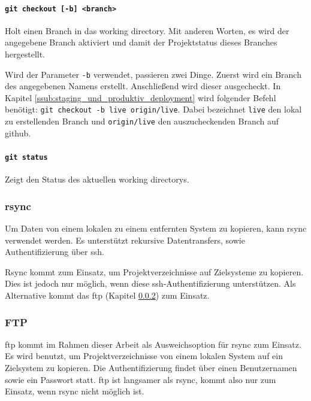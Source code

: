 \paragraph{\lstinline!git checkout [-b] <branch>!} %
\label{par:git_checkout}
Holt einen Branch in das \gls{working directory}. Mit anderen Worten, es wird der angegebene Branch aktiviert und damit der Projektstatus dieses Branches hergestellt.

Wird der Parameter \lstinline!-b! verwendet, passieren zwei Dinge. Zuerst wird ein Branch des angegebenen Namens erstellt. Anschließend wird dieser ausgecheckt. In Kapitel \ref{ssub:staging_und_produktiv_deployment} wird folgender Befehl benötigt: \lstinline!git checkout -b live origin/live!. Dabei bezeichnet \lstinline!live! den lokal zu erstellenden Branch und \lstinline!origin/live! den aus\-zu\-check\-en\-den Branch auf \gls{github}.


\paragraph{\lstinline!git status!} %
\label{par:git_status}
Zeigt den Status des aktuellen \glspl{working directory}.


\subsubsection{rsync} %
\label{ssub:rsync}

Um Daten von einem lokalen zu einem entfernten System zu kopieren, kann rsync verwendet werden. Es unterstützt rekursive Datentransfers, sowie Authentifizierung über \gls{ssh}.

Rsync kommt zum Einsatz, um Projektverzeichnisse auf Zielsysteme zu kopieren. Dies ist jedoch nur möglich, wenn diese \gls{ssh}-Authentifizierung unterstützen. Als Alternative kommt das \gls{ftp} (Kapitel \ref{ssub:ftp}) zum Einsatz.


\subsubsection{FTP} %
\label{ssub:ftp}

\gls{ftp} kommt im Rahmen dieser Arbeit als Ausweichsoption für \gls{rsync} zum Einsatz. Es wird benutzt, um Projektverzeichnisse von einem lokalen System auf ein Zielsystem zu kopieren. Die Authentifizierung findet über einen Benutzernamen sowie ein Passwort statt. \gls{ftp} ist langsamer als \gls{rsync}, kommt also nur zum Einsatz, wenn \gls{rsync} nicht möglich ist.

